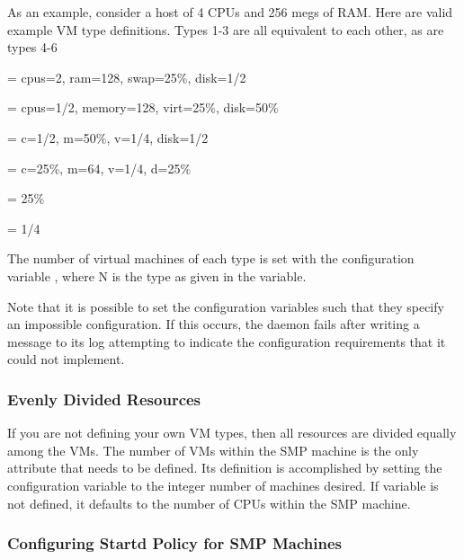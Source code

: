 As an example, consider a
host of 4 CPUs and 256 megs of RAM.
Here are valid example VM type definitions. 
Types 1-3 are all equivalent to each other, as are types 4-6

 = cpus=2, ram=128, swap=25\%, disk=1/2

 = cpus=1/2, memory=128, virt=25\%, disk=50\%

 = c=1/2, m=50\%, v=1/4, disk=1/2

 = c=25\%, m=64, v=1/4, d=25\%

 = 25\%

 = 1/4


The number of virtual machines of each type is set with the
configuration variable
,
where N is the type as given in the
variable.

Note that it is possible to set the configuration variables such
that they specify an impossible configuration.
If this occurs, the  daemon fails after writing
a message to its log attempting to indicate the configuration
requirements that it could not implement.

\subsubsection{\label{sec:Config-VM-Number}
Evenly Divided Resources}

If you are not defining your own VM types, then all resources
are divided equally among the VMs.
The number of VMs within the SMP machine is the only attribute
that needs to be defined.
Its definition is accomplished by setting the configuration
variable  to the
integer number of machines desired.
If variable  is not defined,
it defaults to the number of CPUs within the SMP machine.


\subsubsection{\label{sec:Config-SMP-Policy}
Configuring Startd Policy for SMP Machines}

